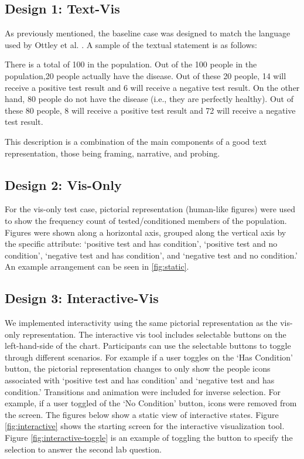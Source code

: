 \subsection{Design 1: Text-Vis}
As previously mentioned, the baseline case was designed to match the language used by Ottley et al. \cite{Ottley2016}. A sample of the textual statement is as follows:

\begin{displayquote}
    There is a total of 100 in the population. Out of the 100 people in the population,20 people actually have the disease. Out of these 20 people, 14 will receive a positive test result and 6 will receive a negative test result. On the other hand, 80 people do not have the disease (i.e., they are perfectly healthy). Out of these 80 people, 8 will receive a positive test result and 72 will receive a negative test result.
\end{displayquote}

This description is a combination of the main components of a good text representation, those being framing, narrative, and probing.

\subsection{Design 2: Vis-Only}

\staticVis

For the vis-only test case, pictorial representation (human-like figures) were used to show the frequency count of tested/conditioned members of the population. Figures were shown along a horizontal axis, grouped along the vertical axis by the specific attribute: ‘positive test and has condition’, ‘positive test and no condition’, ‘negative test and has condition’, and ‘negative test and no condition.’ An example arrangement can be seen in \ref{fig:static}. 

\subsection{Design 3: Interactive-Vis}

\interactiveVis

\interactiveVisToggle

We implemented interactivity using the same pictorial representation as the
vis-only representation. The interactive vis tool includes selectable buttons
on the left-hand-side of the chart. Participants can use the selectable
buttons to toggle through different scenarios. For example if a user toggles
on the ‘Has Condition’ button, the pictorial representation changes to only
show the people icons associated with ‘positive test and has condition’ and
‘negative test and has condition.’ Transitions and animation were included
for inverse selection. For example, if a user toggled of the ‘No Condition’
button, icons were removed from the screen. The figures below show a static
view of interactive states. Figure \ref{fig:interactive} shows the starting screen for the
interactive visualization tool. Figure \ref{fig:interactive-toggle} is an example of toggling the button
to specify the selection to answer the second lab question.


